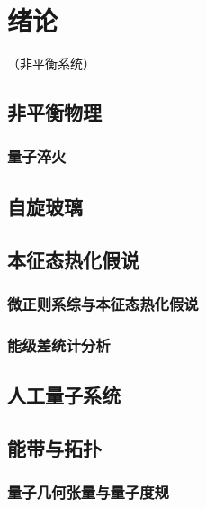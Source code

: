 
\chapter{绪论}

（非平衡系统）

\section{非平衡物理}

	\subsection{量子淬火}

\section{自旋玻璃}

\section{本征态热化假说}

	\subsection{微正则系综与本征态热化假说}

	\subsection{能级差统计分析}

\section{人工量子系统}

\section{能带与拓扑}

	\subsection{量子几何张量与量子度规}

